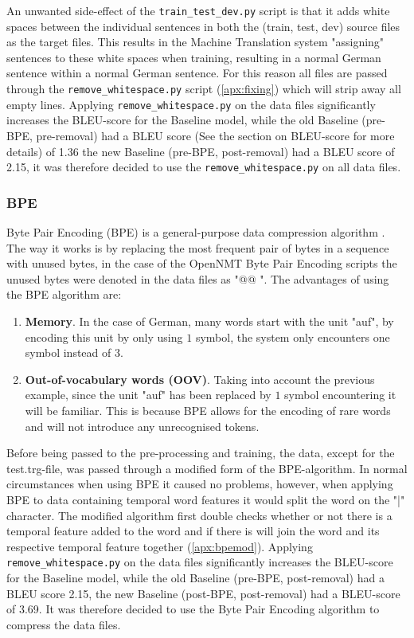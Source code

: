 An unwanted side-effect of the \texttt{train\_test\_dev.py} \cite{dimitarshterionovtrain} script is that it adds white spaces between the individual sentences in both the (train, test, dev) source files as the target files. This results in the Machine Translation system "assigning" sentences to these white spaces when training, resulting in a normal German sentence within a normal German sentence. For this reason all files are passed through the \texttt{remove\_whitespace.py} script (\autoref{apx:fixing}) which will strip away all empty lines. Applying \texttt{remove\_whitespace.py} on the data files significantly increases the BLEU-score for the Baseline model, while the old Baseline (pre-BPE, pre-removal) had a BLEU score (See the section on BLEU-score for more details) of 1.36 the new Baseline (pre-BPE, post-removal) had a BLEU score of 2.15, it was therefore decided to use the \texttt{remove\_whitespace.py} on all data files.


\subsubsection{BPE}

Byte Pair Encoding (BPE) is a general-purpose data compression algorithm \cite{sennrich2015neural} \cite{gage1994new}. The way it works is by replacing the most frequent pair of bytes in a sequence with unused bytes, in the case of the OpenNMT Byte Pair Encoding \cite{klein-etal-2017-opennmt} scripts the unused bytes were denoted in the data files as "@@ ". The advantages of using the BPE algorithm are:

\begin{enumerate}
    \item \textbf{Memory}. In the case of German, many words start with the unit "auf", by encoding this unit by only using $1$ symbol, the system only encounters one symbol instead of $3$. \cite{gage1994new}
    \item \textbf{Out-of-vocabulary words (OOV)}. Taking into account the previous example, since the unit "auf" has been replaced by $1$ symbol encountering it will be familiar. This is because BPE allows for the encoding of rare words and will not introduce any unrecognised tokens. \cite{gage1994new} \cite{sennrich2015neural}
\end{enumerate}

Before being passed to the pre-processing and training, the data, except for the test.trg-file, was passed through a modified form of the BPE-algorithm. In normal circumstances when using BPE it caused no problems, however, when applying BPE to data containing temporal word features it would split the word on the "|" character. The modified algorithm first double checks whether or not there is a temporal feature added to the word and if there is will join the word and its respective temporal feature together (\autoref{apx:bpemod}). Applying \texttt{remove\_whitespace.py} on the data files significantly increases the BLEU-score for the Baseline model, while the old Baseline (pre-BPE, post-removal) had a BLEU score 2.15, the new Baseline (post-BPE, post-removal) had a BLEU-score of 3.69. It was therefore decided to use the Byte Pair Encoding algorithm to compress the data files. 


